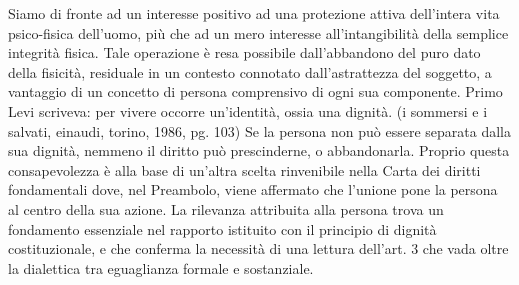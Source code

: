 Siamo di fronte ad un interesse positivo ad una protezione attiva dell’intera vita psico-fisica dell’uomo, più che ad un mero interesse all’intangibilità della semplice integrità fisica. Tale operazione è resa possibile dall’abbandono del puro dato della fisicità, residuale in un contesto connotato dall’astrattezza del soggetto, a vantaggio di un concetto di persona comprensivo di ogni sua componente.
Primo Levi scriveva: per vivere occorre un’identità, ossia una dignità. (i sommersi e i salvati, einaudi, torino, 1986, pg. 103)
Se la persona non può essere separata dalla sua dignità, nemmeno il diritto può prescinderne, o abbandonarla. Proprio questa consapevolezza è alla base di un’altra scelta rinvenibile nella Carta dei diritti fondamentali dove, nel Preambolo, viene affermato che l’unione pone la persona al centro della sua azione.
La rilevanza attribuita alla persona trova un fondamento essenziale nel rapporto istituito con il principio di dignità costituzionale, e che conferma la necessità di una lettura dell’art. 3 che vada oltre la dialettica tra eguaglianza formale e sostanziale.


